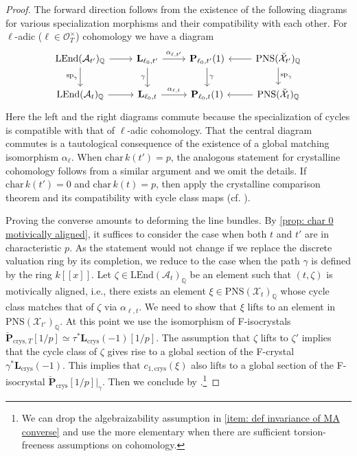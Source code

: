 \documentclass[11pt, letterpaper]{amsart}
\theoremstyle{plain}
\theoremstyle{definition}
\newcommand{\IQ}{\mathbb{Q}}
\newcommand{\<}{\langle}
\renewcommand{\>}{\rangle}
\newcommand{\sO}{\mathcal{O}}
\newcommand{\sA}{\mathcal{A}}
\newcommand{\sX}{\mathcal{X}}
\newcommand{\bL}{\mathbf{L}}
\newcommand{\LEnd}{\mathrm{LEnd}}
\newcommand{\crys}{\mathrm{crys}}
\newcommand{\PNS}{\mathrm{PNS}}
\newcommand{\bP}{\mathbf{P}}
\renewcommand{\sp}{\mathrm{sp}}
\begin{document}
\begin{proof}
    The forward direction follows from the existence of the following diagrams for various specialization morphisms and their compatibility with each other. For $\ell$-adic ($\ell \in \sO_T^\times$) cohomology we have a diagram 
    \begin{equation}
        \begin{tikzcd}
	{\LEnd(\sA_{t'})_\IQ} & {\bL_{\ell_0, t'}} & {\bP_{\ell_0, t'}(1)} & {\PNS(\breve{\sX}_{t'})_\IQ} \\
	{\LEnd(\sA_{t})_\IQ} & {\bL_{\ell_0, t}} & {\bP_{\ell_0, t}(1)} & {\PNS(\breve{\sX_{t}})_\IQ}
	\arrow[from=1-1, to=1-2]
	\arrow["{\sp_\gamma}"', from=1-1, to=2-1]
	\arrow["{{{{\alpha_{\ell, t'}}}}}", from=1-2, to=1-3]
	\arrow["\gamma"', from=1-2, to=2-2]
	\arrow["\gamma", from=1-3, to=2-3]
	\arrow[from=1-4, to=1-3]
	\arrow["{{{\sp_\gamma}}}", from=1-4, to=2-4]
	\arrow[from=2-1, to=2-2]
	\arrow["{{{{\alpha_{\ell, t}}}}}", from=2-2, to=2-3]
	\arrow[from=2-4, to=2-3]
\end{tikzcd}
    \end{equation}
    Here the left and the right diagrams commute because the specialization of cycles is compatible with that of $\ell$-adic cohomology. That the central diagram commutes is a tautological consequence of the existence of a global matching isomorphism $\alpha_\ell$.  
    When $\mathrm{char\,} k(t') = p$, the analogous statement for crystalline cohomology follows from a similar argument and we omit the details. 
    If $\mathrm{char\,} k(t') = 0$ and $\mathrm{char\,} k(t) = p$, then apply the crystalline comparison theorem and its compatibility with cycle class maps (cf. \cite[Cor.~11.6]{IIK}). 

    Proving the converse amounts to deforming the line bundles. 
    By \cref{prop: char 0 motivically aligned}, it suffices to consider the case when both $t$ and $t'$ are in characteristic $p$. 
    As the statement would not change if we replace the discrete valuation ring by its completion, we reduce to the case when the path $\gamma$ is defined by the ring $k[\![x]\!]$. 
    Let $\zeta \in \LEnd(\sA_{t})_\IQ$ be an element such that $(t, \zeta)$ is motivically aligned, i.e., there exists an element $\xi \in \PNS(\sX_t)_\IQ$ whose cycle class matches that of $\zeta$ via $\alpha_{\ell, t}$. 
    We need to show that $\xi$ lifts to an element in $\PNS(\sX_{t'})_\IQ$. 
    At this point we use the isomorphism of F-isocrystals $\breve{\bP}_{\crys, T}[1/p] \simeq \tau^* \bL_\crys(-1)[1/p]$.  
    The assumption that $\zeta$ lifts to $\zeta'$ implies that the cycle class of $\zeta$ gives rise to a global section of the F-crystal $\gamma^* \bL_\crys(-1)$. This implies that $c_{1, \crys}(\xi)$ also lifts to a global section of the F-isocrystal $\breve{\bP}_{\crys}[1/p]|_\gamma$. 
    Then we conclude by \cite[Thm.~3.6]{Morrow}.\footnote{We can drop the algebraizability assumption in \ref{item: def invariance of MA converse} and use the more elementary \cite[Cor.~1.13]{OgusCrystals} when there are sufficient torsion-freeness assumptions on cohomology.}
\end{proof}
\end{document}
